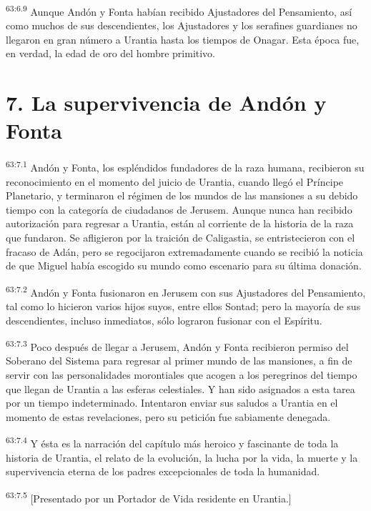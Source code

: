 \par
\textsuperscript{63:6.9} Aunque Andón y Fonta habían recibido Ajustadores del Pensamiento, así como muchos de sus descendientes, los Ajustadores y los serafines guardianes no llegaron en gran número a Urantia hasta los tiempos de Onagar. Esta época fue, en verdad, la edad de oro del hombre primitivo.

\section*{7. La supervivencia de Andón y Fonta}
\par
\textsuperscript{63:7.1} Andón y Fonta, los espléndidos fundadores de la raza humana, recibieron su reconocimiento en el momento del juicio de Urantia, cuando llegó el Príncipe Planetario, y terminaron el régimen de los mundos de las mansiones a su debido tiempo con la categoría de ciudadanos de Jerusem. Aunque nunca han recibido autorización para regresar a Urantia, están al corriente de la historia de la raza que fundaron. Se afligieron por la traición de Caligastia, se entristecieron con el fracaso de Adán, pero se regocijaron extremadamente cuando se recibió la noticia de que Miguel había escogido su mundo como escenario para su última donación.

\par
\textsuperscript{63:7.2} Andón y Fonta fusionaron en Jerusem con sus Ajustadores del Pensamiento, tal como lo hicieron varios hijos suyos, entre ellos Sontad; pero la mayoría de sus descendientes, incluso inmediatos, sólo lograron fusionar con el Espíritu.

\par
\textsuperscript{63:7.3} Poco después de llegar a Jerusem, Andón y Fonta recibieron permiso del Soberano del Sistema para regresar al primer mundo de las mansiones, a fin de servir con las personalidades morontiales que acogen a los peregrinos del tiempo que llegan de Urantia a las esferas celestiales. Y han sido asignados a esta tarea por un tiempo indeterminado. Intentaron enviar sus saludos a Urantia en el momento de estas revelaciones, pero su petición fue sabiamente denegada.

\par
\textsuperscript{63:7.4} Y ésta es la narración del capítulo más heroico y fascinante de toda la historia de Urantia, el relato de la evolución, la lucha por la vida, la muerte y la supervivencia eterna de los padres excepcionales de toda la humanidad.

\par
\textsuperscript{63:7.5} [Presentado por un Portador de Vida residente en Urantia.]